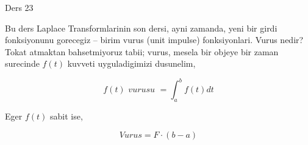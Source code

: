 \documentclass[12pt,fleqn]{article}
\begin{document}
Ders 23 

Bu ders Laplace Transformlarinin son dersi, ayni zamanda, yeni bir girdi
fonksiyonunu gorecegiz -- birim vurus (unit impulse) fonksiyonlari. Vurus
nedir? Tokat atmaktan bahsetmiyoruz tabii; vurus, mesela bir objeye bir zaman
surecinde $f(t)$ kuvveti uyguladigimizi dusunelim, 

\[ f(t) \textit{ vurusu } = \int _{a}^{b}f(t)dt \]

Eger $f(t)$ sabit ise, 

\[ Vurus = F \cdot (b-a) \]
\end{document}
